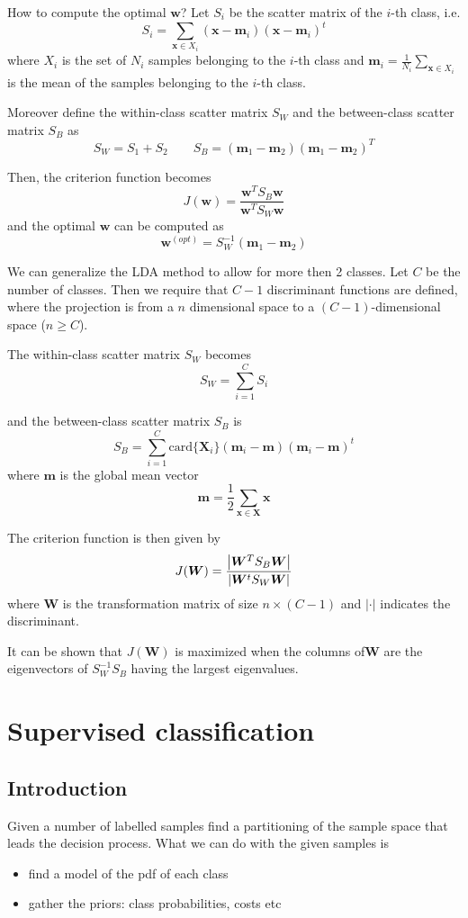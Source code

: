 \documentclass[oneside,onecolumn]{report}
\begin{document}
How to compute the optimal $\bm w$?
Let $S_i$ be the scatter matrix of the $i$-th class, i.e.
$$ S_i = \sum_{\bm x \in X_i} (\bm x - \bm m_i) (\bm x - \bm m_i)^t $$
where $X_i$ is the set of $N_i$ samples belonging to the $i$-th class and $\bm m_i = \frac{1}{N_i} \sum_{\bm x \in X_i}$ is the mean of the samples belonging to the $i$-th class.

Moreover define the within-class scatter matrix $S_W$ and the between-class scatter matrix $S_B$ as
$$ S_W = S_1 + S_2 \qquad S_B = (\bm m_1 - \bm m_2)(\bm m_1 - \bm m_2)^T $$

Then, the criterion function becomes
$$ J(\bm w) = \frac{\bm w^T S_B \bm w}{\bm w^T S_W \bm w} $$
and the optimal $\bm w$ can be computed as
$$ \bm w^{(opt)} = S_W^{-1} (\bm m_1 - \bm m_2) $$

We can generalize the LDA method to allow for more then 2 classes.
Let $C$ be the number of classes.
Then we require that $C - 1$ discriminant functions are defined, where the projection is from a $n$ dimensional space to a $(C - 1)$-dimensional space ($n \geq C$).

The within-class scatter matrix $S_W$ becomes
$$ S_W = \sum_{i = 1}^C S_i $$

and the between-class scatter matrix $S_B$ is
$$ S_B = \sum_{i = 1}^C \text{card}\{\bm X_i\} (\bm m_i - \bm m) (\bm m_i - \bm m)^t $$
where $\bm m$ is the global mean vector
$$ \bm m = \frac{1}{2} \sum_{\bm x \in \bm X} \bm x $$

The criterion function is then given by
$$ J(\bm W) = \frac{\abs{\bm W^T S_B \bm W}}{\abs{\bm W^t S_W \bm W}} $$
where $\bm W$ is the transformation matrix of size $n \times (C - 1)$ and $|\cdot|$ indicates the discriminant.

It can be shown that $J(\bm W)$ is maximized when the columns of$\bm W$ are the eigenvectors of $S_W^{-1} S_B$ having the largest eigenvalues.



\clearpage
\chapter{Supervised classification}

\section{Introduction}
Given a number of labelled samples find a partitioning of the sample space that leads the decision process.
What we can do with the given samples is
\begin{itemize}
    \item find a model of the pdf of each class
    \item gather the priors: class probabilities, costs etc
\end{itemize}
\end{document}
